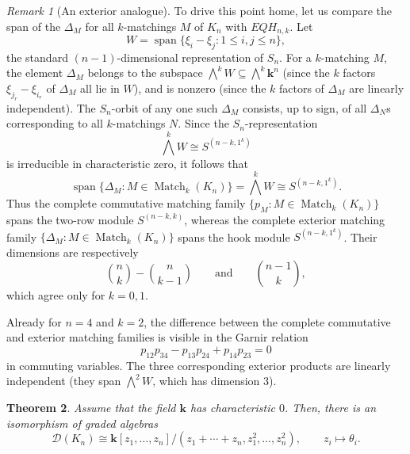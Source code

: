 \documentclass[12pt]{amsart}
\newtheorem{theorem}{Theorem}[section]
\theoremstyle{definition}
\theoremstyle{remark}
\newtheorem{remark}[theorem]{Remark}
\newcommand{\kk}{\mathbf{k}}
\newcommand{\Span}{\operatorname{span}}
\newcommand{\Match}{\operatorname{Match}}
\begin{document}
\begin{remark}[An exterior analogue]
To drive this point home, let us compare the span of the $\Delta_M$
for all $k$-matchings $M$ of $K_n$ with $EQH_{n,k}$.  Let
\[
 W=\Span\{\xi_i-\xi_j:1\leq i,j\leq n\},
\]
the standard $(n-1)$-dimensional representation of $S_n$.
For a $k$-matching $M$, the element $\Delta_M$ belongs to
the subspace $\bigwedge^k W\subseteq\bigwedge^k \kk^n$
(since the $k$ factors $\xi_{j_r} - \xi_{i_r}$ of $\Delta_M$ all lie in $W$),
and is nonzero (since the $k$ factors of $\Delta_M$
are linearly independent).  The $S_n$-orbit of any one such
$\Delta_M$ consists, up to sign, of all $\Delta_N$s corresponding
to all $k$-matchings $N$.  Since the $S_n$-representation
\[
 \bigwedge^k W\cong S^{(n-k,1^k)}
\]
is irreducible in characteristic zero, it follows that
\begin{equation}\label{eq:exterior-matching-span}
 \Span\{\Delta_M:M\in\Match_k(K_n)\}
 =\bigwedge^k W\cong S^{(n-k,1^k)}.
\end{equation}
Thus the complete commutative matching family
$\{p_M:M\in\Match_k(K_n)\}$ spans the two-row module
$S^{(n-k,k)}$, whereas the complete exterior matching family
$\{\Delta_M:M\in\Match_k(K_n)\}$ spans the hook
module $S^{(n-k,1^k)}$.  Their dimensions are respectively
\[
 \binom nk-\binom n{k-1}
 \qquad\text{and}\qquad
 \binom{n-1}{k},
\]
which agree only for $k=0,1$.

Already for $n=4$ and $k=2$, the difference between the complete
commutative and exterior matching families is visible in the Garnir relation
\[
 p_{12}p_{34}-p_{13}p_{24}+p_{14}p_{23}=0
\]
in commuting variables.  The three corresponding exterior products are
linearly independent (they span $\bigwedge^2W$, which has dimension $3$).
\end{remark}

\begin{theorem}\label{thm:presentation}
Assume that the field $\kk$ has characteristic $0$.
Then, there is an isomorphism of graded algebras
\[
 \mathcal D(K_n)\cong
 \kk[z_1,\ldots,z_n]/
 (z_1+\cdots+z_n,z_1^2,\ldots,z_n^2),
 \qquad z_i\longmapsto\theta_i.
\]
\end{theorem}
\end{document}
